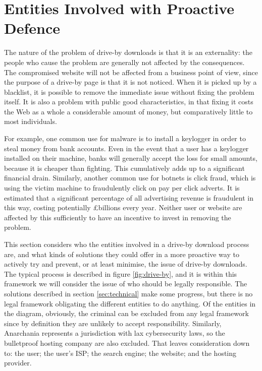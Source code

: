 \documentclass{acm_proc_article-sp}
\begin{document}
\section{Entities Involved with Proactive Defence}
The nature of the problem of drive-by downloads is that it is an externality: the people who cause the problem are generally not affected by the consequences.  The compromised website will not be affected from a business point of view, since the purpose of a drive-by page is that it is not noticed.  When it is picked up by a blacklist, it is possible to remove the immediate issue without fixing the problem itself. It is also a problem with public good characteristics, in that fixing it costs the Web as a whole a considerable amount of money, but comparatively little to most individuals.  

For example, one common use for malware is to install a keylogger in order to steal money from bank accounts.  Even in the event that a user has a keylogger installed on their machine, banks will generally accept the loss for small amounts, because it is cheaper than fighting.  This cumulatively adds up to a significant financial drain.  Similarly, another common use for botnets is click fraud, which is using the victim machine to fraudulently click on pay per click adverts.  It is estimated that a significant percentage of all advertising revenue is fraudulent in this way, costing potentially \pounds{billions} every year.  Neither user or website are affected by this sufficiently to have an incentive to invest in removing the problem.

This section considers who the entities involved in a drive-by download process are, and what kinds of solutions they could offer in a more proactive way to actively try and prevent, or at least minimise, the issue of drive-by downloads.  The typical process is described in figure \ref{fig:drive-by}, and it is within this framework we will consider the issue of who should be legally responsible.  The solutions described in section \ref{sec:technical} make some progress, but there is no legal framework obligating the different entities to do anything.  Of the entities in the diagram, obviously, the criminal can be excluded from any legal framework since by definition they are unlikely to accept responsibility.  Similarly, Anarchania represents a jurisdiction with lax cybersecurity laws, so the bulletproof hosting company are also excluded.  That leaves consideration down to: the user; the user's ISP; the search engine; the website; and the hosting provider.
\end{document}
